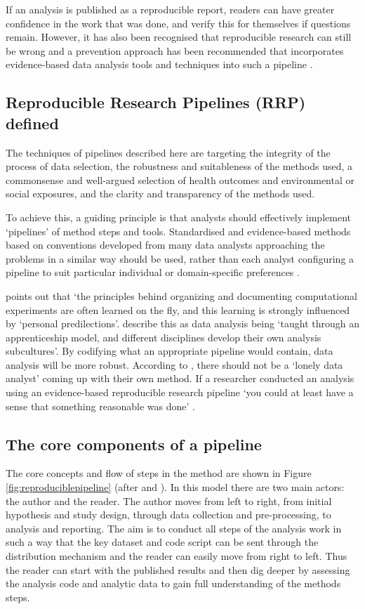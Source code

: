 \documentclass[11pt,a4paper]{article}
\begin{document}
If an analysis is published as a reproducible report, readers can have greater confidence 
in the work that was done, and verify this for themselves if questions remain. However, it has also been recognised that reproducible research can still be wrong and a
prevention approach has been recommended that incorporates
evidence-based data analysis tools and techniques into such a pipeline
\citep{Leek2015a}.

\subsection{Reproducible Research Pipelines (RRP) defined}


The techniques of pipelines described here are targeting the integrity
of the process of data selection, the robustness and suitableness of the
methods used, a commonsense and well-argued selection of health outcomes
and environmental or social exposures, and the clarity and transparency
of the methods used.

To achieve this, a guiding principle is that analysts should effectively
implement `pipelines' of method steps and tools. Standardised and
evidence-based methods based on conventions developed from many data
analysts approaching the problems in a similar way should be used,
rather than each analyst configuring a pipeline to suit particular
individual or domain-specific preferences \citep{Borer2009a,White2013}.

\citet{Noble2009} points out that `the principles behind organizing and
documenting computational experiments are often learned on the fly, and
this learning is strongly influenced by `personal predilections'. 
\citet{Leek2015b} describe this as data analysis being `taught through an
apprenticeship model, and different disciplines develop their own
analysis subcultures'. By codifying what an appropriate pipeline would
contain, data analysis will be more robust. According to \citet{Peng},
there should not be a `lonely data analyst' coming up with their own
method. If a researcher conducted an analysis using an evidence-based
reproducible research pipeline `you could at least have a sense that
something reasonable was done' \citep{Peng}.

\subsection{The core components of a pipeline}\label{the-core-components-of-a-pipeline}

The core concepts and flow of steps in the method are shown in Figure
\ref{fig:reproduciblepipeline} (after \citet{Peng2006} and
\citet{Solymos2008}).  In this model there are two main
actors: the author and the reader.  The author moves from left to
right, from initial hypothesis and study design, through data
collection and pre-processing, to analysis and reporting. The aim is
to conduct all steps of the analysis work in such a way that the key
dataset and code script can be sent through the distribution mechanism
and the reader can easily move from right to left. Thus the reader can
start with the published results and then dig deeper by assessing the
analysis code and analytic data to gain full understanding of the
methods steps.
\end{document}
